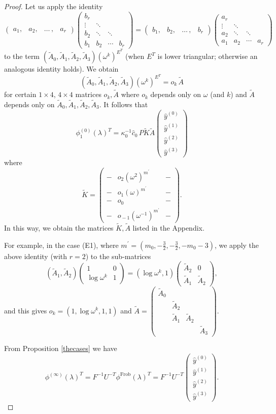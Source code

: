 \documentclass[a4paper,12pt,leqno]{amsart}
\numberwithin{equation}{section}
\theoremstyle{plain}
\theoremstyle{definition}
\newcommand{\la}{\lambda}
\newcommand{\om}{\omega}
\newcommand{\ka}{\kappa}
\newcommand{\no}{\noindent}
\newcommand{\pr}{\prime}
\newcommand{\bp}{\begin{pmatrix}}
\newcommand{\ep}{\end{pmatrix}}
\newcommand{\bsp}{\left(\begin{smallmatrix}}
\newcommand{\esp}{\end{smallmatrix}\right)}
\newcommand{\Phii}{\Phi^{(\infty)}}
\newcommand{\phiz}{\phi^{(0)}}
\newcommand{\phii}{\phi^{(\infty)}}
\newcommand{\nn}{m}
\begin{document}
{\begin{proof}
Let us apply the identity
\begin{equation*}
\bsp \!a_1, & a_2, & \dots\, , & a_r\! \esp
\bsp
b_r & & & 
\\
\vdots & \ddots & &
\\
b_2 & \ddots & \ddots & 
\\
b_1 & b_2 & \cdots & b_r
\esp
=
\bsp \! b_1, & b_2, & \dots\, , & b_r \! \esp
\bsp
a_r & & & 
\\
\vdots & \ddots & &
\\
a_2 & \ddots & \ddots & 
\\
a_1 & a_2 & \cdots & a_r
\esp
\end{equation*}
to the term $(\tilde A_0,\tilde A_1,\tilde A_2,\tilde A_3)
(\om^k)^{E^T}$ (when $E^T$ is lower triangular; otherwise an analogous identity holds). 
We obtain 
\[
(\tilde A_0,\tilde A_1,\tilde A_2,\tilde A_3)(\om^k)^{E^T}=
o_k \,\tilde A
\]
for certain $1\times 4$, $4\times 4$ matrices $o_k, \tilde A$
where $o_k$ depends only on $\om$ (and $k$)  and 
$\tilde A$ depends only on $\tilde A_0,\tilde A_1,\tilde A_2,\tilde A_3$.
It follows that
\begin{equation*}
\phiz_1(\la)^T= 
\ka_0^{-1} \hat c_0 \, P \tilde K
\tilde A
\bp
\hat y^{(0)}
\\
\hat y^{(1)}
\\
\hat y^{(2)}
\\
\hat y^{(3)}
\ep
\end{equation*}
where 
\[
\tilde K
=
\bp
- & o_2 (\om^2)^{\nn^\prime} & -
\\
- & o_1 (\om)^{\nn^\prime} & -
\\
- & o_0 & -
\\
- & o_{\!-1} (\om^{-1})^{\nn^\prime} & -
\ep.
\]
In this way, we obtain the matrices $\tilde K,\tilde A$ listed in the Appendix.

For example, in the case (E1), where
$\nn^\pr=(\nn_0,-\tfrac32,-\tfrac32,-\nn_0-3)$,
we apply the above identity (with $r=2$) to the sub-matrices
\[
(\tilde A_1, \tilde A_2)
\bp
1 & 0
\\
\log\om^k & 1
\ep
=
(\log\om^k,1)
\bp
\tilde A_2 & 0
\\
\tilde A_1 & \tilde A_2
\ep,
\]
and this gives
$o_k=(1,\log\om^k,1,1)$ and
$\tilde A=
\bp
\tilde A_0 & & & 
\\
 & \tilde A_2 & & 
\\
 & \tilde A_1  & \tilde A_2   & 
 \\
 & & & \tilde A_3 
\ep$.  

\no{\em (ii) Expression for $\Phii$.}
From Proposition \ref{thecases}  we have 
\[
\phii(\la)^T  = F^{-1}U^{-T} \phi^{\text {Frob}} (\la)^T=
F^{-1}U^{-T}
\bp
\hat y^{(0)}
\\
\hat y^{(1)}
\\
\hat y^{(2)}
\\
\hat y^{(3)}
\ep.
\]


\end{proof}}
\end{document}
